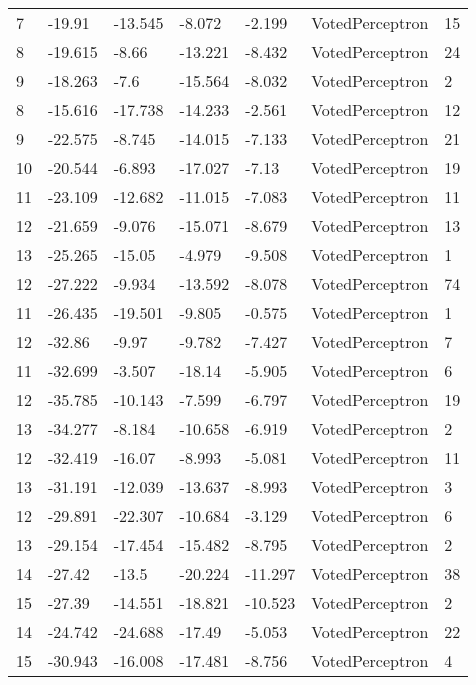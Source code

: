 \begin{tabular}{lllllll}
 7 &  -19.91 & -13.545 &  -8.072 &  -2.199 &    VotedPerceptron &   15 \\
 8 & -19.615 &   -8.66 & -13.221 &  -8.432 &    VotedPerceptron &   24 \\
 9 & -18.263 &    -7.6 & -15.564 &  -8.032 &    VotedPerceptron &    2 \\
 8 & -15.616 & -17.738 & -14.233 &  -2.561 &    VotedPerceptron &   12 \\
 9 & -22.575 &  -8.745 & -14.015 &  -7.133 &    VotedPerceptron &   21 \\
10 & -20.544 &  -6.893 & -17.027 &   -7.13 &    VotedPerceptron &   19 \\
11 & -23.109 & -12.682 & -11.015 &  -7.083 &    VotedPerceptron &   11 \\
12 & -21.659 &  -9.076 & -15.071 &  -8.679 &    VotedPerceptron &   13 \\
13 & -25.265 &  -15.05 &  -4.979 &  -9.508 &    VotedPerceptron &    1 \\
12 & -27.222 &  -9.934 & -13.592 &  -8.078 &    VotedPerceptron &   74 \\
11 & -26.435 & -19.501 &  -9.805 &  -0.575 &    VotedPerceptron &    1 \\
12 &  -32.86 &   -9.97 &  -9.782 &  -7.427 &    VotedPerceptron &    7 \\
11 & -32.699 &  -3.507 &  -18.14 &  -5.905 &    VotedPerceptron &    6 \\
12 & -35.785 & -10.143 &  -7.599 &  -6.797 &    VotedPerceptron &   19 \\
13 & -34.277 &  -8.184 & -10.658 &  -6.919 &    VotedPerceptron &    2 \\
12 & -32.419 &  -16.07 &  -8.993 &  -5.081 &    VotedPerceptron &   11 \\
13 & -31.191 & -12.039 & -13.637 &  -8.993 &    VotedPerceptron &    3 \\
12 & -29.891 & -22.307 & -10.684 &  -3.129 &    VotedPerceptron &    6 \\
13 & -29.154 & -17.454 & -15.482 &  -8.795 &    VotedPerceptron &    2 \\
14 &  -27.42 &   -13.5 & -20.224 & -11.297 &    VotedPerceptron &   38 \\
15 &  -27.39 & -14.551 & -18.821 & -10.523 &    VotedPerceptron &    2 \\
14 & -24.742 & -24.688 &  -17.49 &  -5.053 &    VotedPerceptron &   22 \\
15 & -30.943 & -16.008 & -17.481 &  -8.756 &    VotedPerceptron &    4 \\

\end{tabular}
